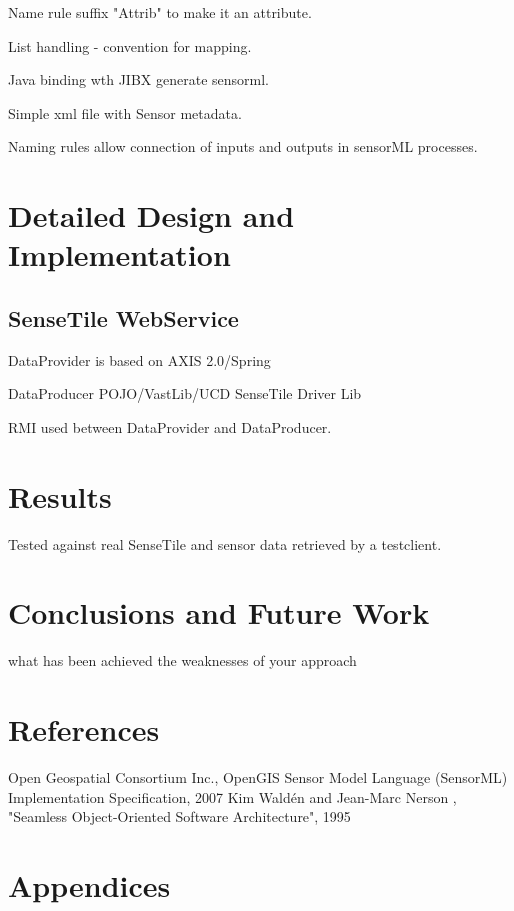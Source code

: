\documentclass[]{final_report}
\begin{document}
Name rule suffix "Attrib" to make it an attribute.

List handling - convention for mapping.

Java binding wth JIBX  generate sensorml.

Simple xml file with Sensor metadata.

Naming rules allow connection of inputs and outputs
in sensorML processes.


\chapter{ Detailed Design and Implementation}

\section{SenseTile WebService}

DataProvider is based on AXIS 2.0/Spring

DataProducer POJO/VastLib/UCD SenseTile Driver Lib

RMI used between DataProvider and DataProducer.
\chapter{Results}

Tested against real SenseTile and sensor data retrieved by a testclient.


\chapter{ Conclusions and Future Work}

what has been achieved
the weaknesses of your approach

\chapter{References}
\newpage
\begin{thebibliography}{99}
Open Geospatial Consortium Inc., OpenGIS Sensor Model Language (SensorML) Implementation Specification, 2007
Kim Waldén and Jean-Marc Nerson , "Seamless Object-Oriented Software Architecture", 1995
\end{thebibliography}
\label{endpage}


\chapter{Appendices}
\end{document}
